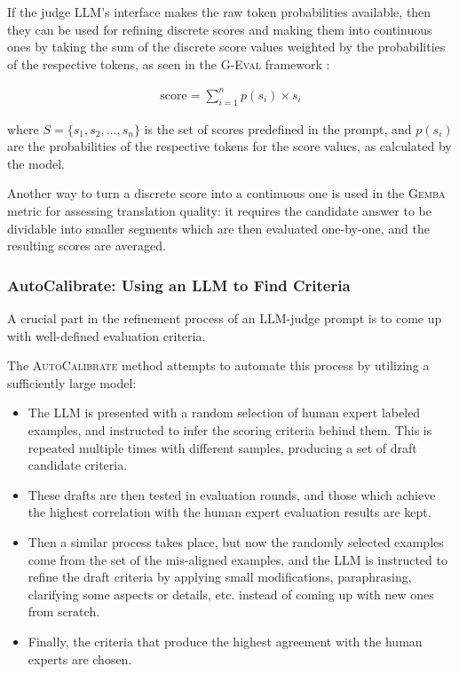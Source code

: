 \documentclass[UTF8,noindent,nohyp,parspace,titlepage,a4paper,12pt]{article}
\begin{document}
        If the judge LLM's interface makes the raw token probabilities
        available, then they can be used for refining discrete scores and
        making them into continuous ones by taking the sum of the discrete
        score values weighted by the probabilities of the respective tokens, as
        seen in the \textsc{G-Eval} framework \cite{geval}:

        \begin{align}
          \text{score} = \sum_{i=1}^n p(s_i) \times s_i
        \end{align}

        where $S = \{s_1, s_2, \ldots, s_n\}$ is the set of scores predefined
        in the prompt, and $p(s_i)$ are the probabilities of the respective
        tokens for the score values, as calculated by the model.

        Another way to turn a discrete score into a continuous one is used
        in the \textsc{Gemba} metric \cite{gemba} for assessing translation
        quality: it requires the candidate answer to be dividable into smaller
        segments which are then evaluated one-by-one, and the resulting scores
        are averaged.

      \subsubsection{AutoCalibrate: Using an LLM to Find Criteria}

        A crucial part in the refinement process of an LLM-judge prompt is to
        come up with well-defined evaluation criteria.

        The \textsc{AutoCalibrate} method \cite{autocal} attempts to automate
        this process by utilizing a sufficiently large model:

        \begin{itemize}
          \item The LLM is presented with a random selection of human expert
                labeled examples, and instructed to infer the scoring
                criteria behind them. This is repeated multiple times with
                different samples, producing a set of draft candidate criteria.

          \item These drafts are then tested in evaluation rounds, and those
                which achieve the highest correlation with the human expert
                evaluation results are kept.

          \item Then a similar process takes place, but now the randomly
                selected examples come from the set of the mis-aligned
                examples, and the LLM is instructed to refine the draft
                criteria by applying small modifications, paraphrasing,
                clarifying some aspects or details, etc. instead of coming up
                with new ones from scratch.

          \item Finally, the criteria that produce the highest agreement with
                the human experts are chosen.
      \end{itemize}
\end{document}
